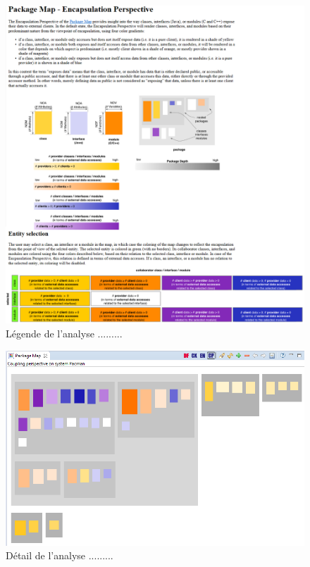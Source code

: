 \documentclass[12pt,a4paper,final]{article}
\begin{document}
\begin{figure}
	\centering
	\includegraphics[width=\textwidth]{images/InCodeEncapsulationLegende.png}
	\caption{\label{incodeEncLeg}Légende de l'analyse .........}
\end{figure}

\begin{figure}
	\centering
	\includegraphics[width=\textwidth]{images/InCodeCoupling.png}
	\caption{\label{incodeCoupl}Détail de l'analyse .........}
\end{figure}
\end{document}
